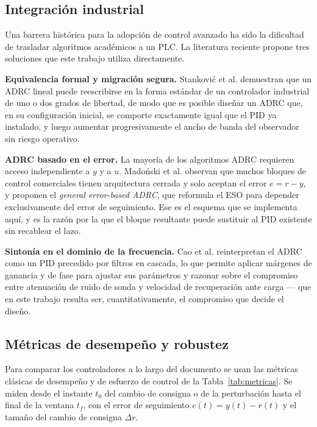 \subsection{Integración industrial}

Una barrera histórica para la adopción de control avanzado ha sido la
dificultad de trasladar algoritmos académicos a un PLC. La literatura reciente
propone tres soluciones que este trabajo utiliza directamente.

\textbf{Equivalencia formal y migración segura.} Stankovi\'c et al.
\cite{stankovic2024pid} demuestran que un ADRC lineal puede reescribirse en la
forma estándar de un controlador industrial de uno o dos grados de libertad, de
modo que es posible diseñar un ADRC que, en su configuración inicial, se
comporte exactamente igual que el PID ya instalado, y luego aumentar
progresivamente el ancho de banda del observador sin riesgo operativo.

\textbf{ADRC basado en el error.} La mayoría de los algoritmos ADRC requieren
acceso independiente a $y$ y a $u$. Madoński et al. \cite{madonski2019general}
observan que muchos bloques de control comerciales tienen arquitectura cerrada
y solo aceptan el error $e=r-y$, y proponen el \emph{general error-based ADRC},
que reformula el ESO para depender exclusivamente del error de seguimiento.
Ese es el esquema que se implementa aquí, y es la razón por la que el bloque
resultante puede sustituir al PID existente sin recablear el lazo.

\textbf{Sintonía en el dominio de la frecuencia.} Cao et al.
\cite{cao2025cascaded} reinterpretan el ADRC como un PID precedido por filtros
en cascada, lo que permite aplicar márgenes de ganancia
y de fase para ajustar sus parámetros y razonar sobre el compromiso entre
atenuación de ruido de sonda y velocidad de recuperación ante carga --- que en
este trabajo resulta ser, cuantitativamente, el compromiso que decide el
diseño.


\subsection{Métricas de desempeño y robustez}
\label{subsec:metricas}

Para comparar los controladores a lo largo del documento se usan las métricas clásicas de desempeño y
de esfuerzo de control de la Tabla~\ref{tab:metricas}. Se miden desde el instante
$t_0$ del cambio de consigna o de la perturbación hasta el final de la ventana $t_f$, con el error de
seguimiento $e(t) = y(t) - r(t)$ y el tamaño del cambio de consigna $\Delta r$.

